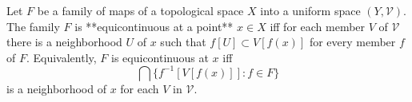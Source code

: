 Let $F$ be a family of maps of a topological space $X$ into a uniform space $(Y, \mathcal{V})$. The family $F$ is **equicontinuous at a point** $x \in X$ iff for each member $V$ of $\mathcal{V}$ there is a neighborhood $U$ of $x$ such that $f[U] \subset V[f(x)]$ for every member $f$ of $F$. Equivalently, $F$ is equicontinuous at $x$ iff
$$\bigcap \{f^{-1}[V[f(x)]] : f \in F\}$$
is a neighborhood of $x$ for each $V$ in $\mathcal{V}$.
